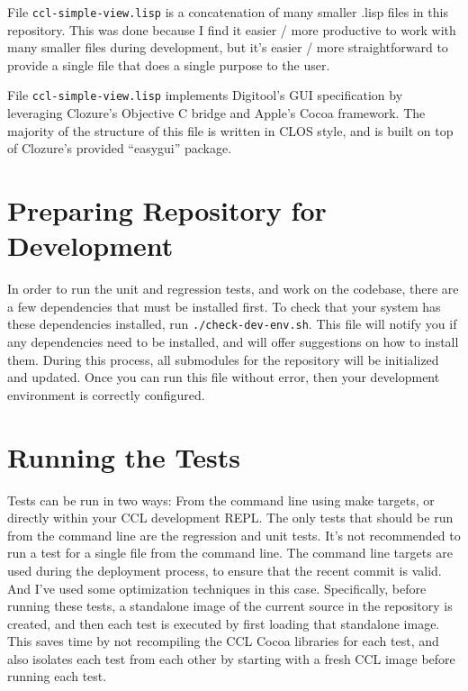 \documentclass[12pt]{article} %
\newcommand{\code}[1]{\texttt{#1}}
\newcommand{\filesys}[1]{\texttt{#1}}
\begin{document}
File \filesys{ccl-simple-view.lisp} is a concatenation of many smaller .lisp files in this repository.
This was done because I find it easier / more productive to work with many smaller files during development, but it's easier / more straightforward to provide a single file that does a single purpose to the user. 

File \filesys{ccl-simple-view.lisp} implements Digitool's GUI specification by leveraging Clozure's Objective C bridge and Apple's Cocoa framework.
The majority of the structure of this file is written in CLOS style, and is built on top of Clozure's provided ``easygui'' package. 

\section{Preparing Repository for Development}

In order to run the unit and regression tests, and work on the codebase, there are a few dependencies that must be installed first.
To check that your system has these dependencies installed, run \code{./check-dev-env.sh}.
This file will notify you if any dependencies need to be installed, and will offer suggestions on how to install them.
During this process, all submodules for the repository will be initialized and updated.
Once you can run this file without error, then your development environment is correctly configured.

\section{Running the Tests}

Tests can be run in two ways: From the command line using make targets, or directly within your CCL development REPL.
The only tests that should be run from the command line are the regression and unit tests.
It's not recommended to run a test for a single file from the command line.
The command line targets are used during the deployment process, to ensure that the recent commit is valid.
And I've used some optimization techniques in this case.
Specifically, before running these tests, a standalone image of the current source in the repository is created, and then each test is executed by first loading that standalone image.
This saves time by not recompiling the CCL Cocoa libraries for each test, and also isolates each test from each other by starting with a fresh CCL image before running each test.
\end{document}
